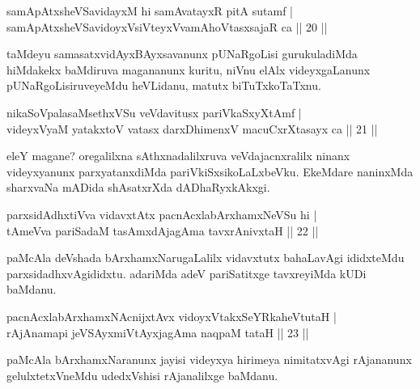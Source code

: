 \begin{shl}
samApAtxsheVSavidayxM hi samAvatayxR pitA sutamf | \\
samApAtxsheVSavidoyxV\s siVteyxVvamAhoVtasxsajaR ca \hfill|| 20 || 
\end{shl}

\begin{artha}
taMdeyu samasatxvidAyxBAyxsavanunx pUNaRgoLisi gurukuladiMda 
hiMdakekx baMdiruva magananunx kuritu, niVnu elAlx videyxgaLanunx 
pUNaRgoLisiruveyeMdu heVLidanu, matutx biTuTxkoTaTxnu. 
\end{artha}


\begin{shl}
nikaSoVpalasaMsethxVSu veVdavitusx pariVkaSxyXtAmf | \\
videyxVyaM yatakxtoV vatasx darxDhimenxV macuCxrXtasayx ca \hfill|| 21 || 
\end{shl}

\begin{artha}
eleY magane? oregalilxna sAthxnadalilxruva veVdajacnxralilx ninanx 
videyxyanunx parxyatanxdiMda pariVkiSxsikoLaLxbeVku. EkeMdare 
naninxMda sharxvaNa mADida shAsatxrXda dADhaRyxkAkxgi.
\end{artha}


\begin{shl}
parxsidAdhx\s tiVva vidavxtAtx pacnAcxlabArxhamxNeVSu hi | \\
tAmeVva pariSadaM tasAmxdAjagAma tavxrAnivxtaH \hfill|| 22 || 
\end{shl}

\begin{artha}
paMcAla deVshada bArxhamxNarugaLalilx vidavxtutx bahaLavAgi ididxteMdu 
parxsidadhxvAgididxtu. adariMda adeV pariSatitxge tavxreyiMda kUDi 
baMdanu.
\end{artha}


\begin{shl}
pacnAcxlabArxhamxNAcnijxtAvx vidoyxVtakxSeYRkaheVtutaH | \\
rAjAnamapi jeVSAyxmiVtAyxjagAma naqpaM tataH \hfill|| 23 || 
\end{shl}

\begin{artha}
paMcAla bArxhamxNaranunx jayisi videyxya hirimeya nimitatxvAgi 
rAjananunx gelulxtetxVneMdu udedxVshisi rAjanalilxge baMdanu.
\end{artha}

